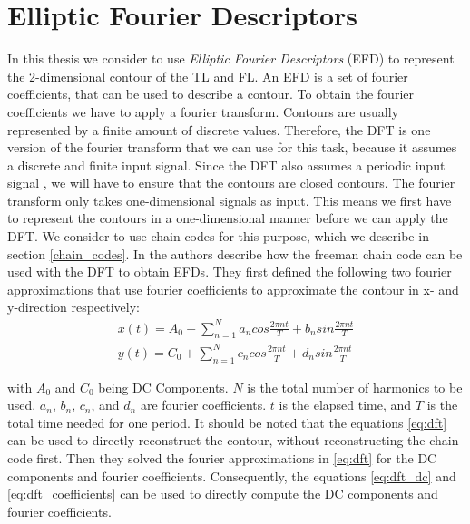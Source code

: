 \documentclass[thesis.tex]{subfiles}
\begin{document}

\section{Elliptic Fourier Descriptors} \label{elliptic_fourier_descriptors}
In this thesis we consider to use \textit{Elliptic Fourier Descriptors} (EFD) \cite{giardinia} to represent the 2-dimensional contour of the TL and FL. An EFD is a set of fourier coefficients, that can be used to describe a contour. To obtain the fourier coefficients we have to apply a fourier transform. Contours are usually represented by a finite amount of discrete values. Therefore, the DFT is one version of the fourier transform that we can use for this task, because it assumes a discrete and finite input signal. Since the DFT also assumes a periodic input signal \cite{dspguide}, we will have to ensure that the contours are closed contours. The fourier transform only takes one-dimensional signals as input. This means we first have to represent the contours in a one-dimensional manner before we can apply the DFT. We consider to use chain codes for this purpose, which we describe in section \ref{chain_codes}. In \cite{giardinia} the authors describe how the freeman chain code can be used with the DFT to obtain EFDs. They first defined the following two fourier approximations that use fourier coefficients to approximate the contour in x- and y-direction respectively:
\begin{equation} \label{eq:dft}
\begin{split}
 x(t) = A_0 + \sum_{n=1}^{N} a_n cos \frac{2\pi n t}{T} + b_n sin \frac{2\pi n t}{T} \\
 y(t) = C_0 + \sum_{n=1}^{N} c_n cos \frac{2\pi n t}{T} + d_n sin \frac{2\pi n t}{T}
\end{split}
\end{equation}

with $ A_0$ and $C_0 $ being DC Components. $N$ is the total number of harmonics to be used. $a_n$, $b_n$, $c_n$, and $d_n$ are fourier coefficients. $t$ is the elapsed time, and $T$ is the total time needed for one period. It should be noted that the equations \ref{eq:dft} can be used to directly reconstruct the contour, without reconstructing the chain code first. 
Then they solved the fourier approximations in \ref{eq:dft} for the DC components and fourier coefficients. Consequently, the equations \ref{eq:dft_dc} and \ref{eq:dft_coefficients} can be used to directly compute the DC components and fourier coefficients. 
\end{document}
